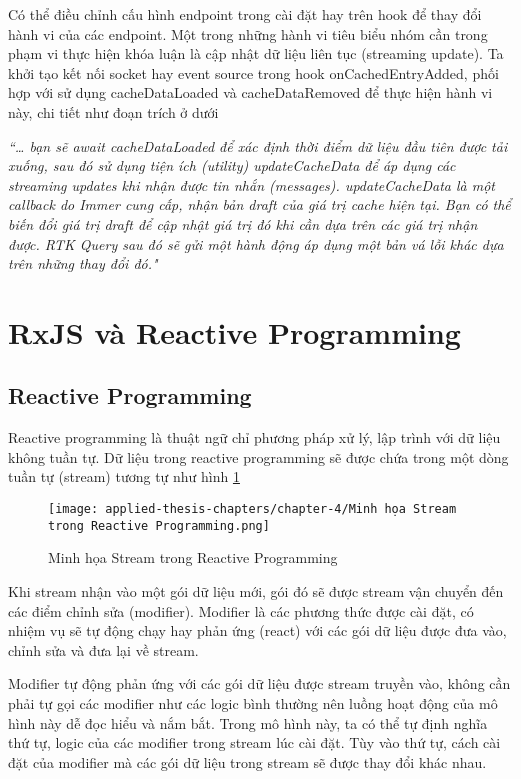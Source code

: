 Có thể điều chỉnh cấu hình endpoint trong cài đặt hay trên hook để thay đổi hành vi của các endpoint.
Một trong những hành vi tiêu biểu nhóm cần trong phạm vi thực hiện khóa luận là cập nhật dữ liệu liên tục (streaming update).
Ta khởi tạo kết nối socket hay event source trong hook onCachedEntryAdded, phối hợp với sử dụng cacheDataLoaded và cacheDataRemoved để thực hiện hành vi này, chi tiết như đoạn trích ở dưới 
\par

\textit{“… bạn sẽ await cacheDataLoaded để xác định thời điểm dữ liệu đầu tiên được tải xuống, sau đó sử dụng tiện ích (utility) updateCacheData để áp dụng các streaming updates khi nhận được tin nhắn (messages).
updateCacheData là một callback do Immer cung cấp, nhận bản draft của giá trị cache hiện tại.
Bạn có thể biến đổi giá trị draft để cập nhật giá trị đó khi cần dựa trên các giá trị nhận được. 
RTK Query sau đó sẽ gửi một hành động áp dụng một bản vá lỗi khác dựa trên những thay đổi đó."} \cite{chap4bib3}

\section{RxJS và Reactive Programming}

\subsection{Reactive Programming}

\tab Reactive programming là thuật ngữ chỉ phương pháp xử lý, lập trình với dữ liệu không tuần tự.
Dữ liệu trong reactive programming sẽ được chứa trong một dòng tuần tự (stream) tương tự như hình \ref{fig:StreamInRP} 

\begin{figure}[H]
  \centering
  \texttt{[image: applied-thesis-chapters/chapter-4/Minh họa Stream trong Reactive Programming.png]}
  \caption{Minh họa Stream trong Reactive Programming \cite{chap4bib4}}
  \label{fig:StreamInRP}
\end{figure}


\tab Khi stream nhận vào một gói dữ liệu mới, gói đó sẽ được stream vận chuyển đến các điểm chỉnh sửa (modifier).
Modifier là các phương thức được cài đặt, có nhiệm vụ sẽ tự động chạy hay phản ứng (react) với các gói dữ liệu được đưa vào, chỉnh sửa và đưa lại về stream.
\par

Modifier tự động phản ứng với các gói dữ liệu được stream truyền vào, không cần phải tự gọi các modifier như các logic bình thường nên luồng hoạt động của mô hình này dễ đọc hiểu và nắm bắt.
Trong mô hình này, ta có thể tự định nghĩa thứ tự, logic của các modifier trong stream lúc cài đặt.
Tùy vào thứ tự, cách cài đặt của modifier mà các gói dữ liệu trong stream sẽ được thay đổi khác nhau.


